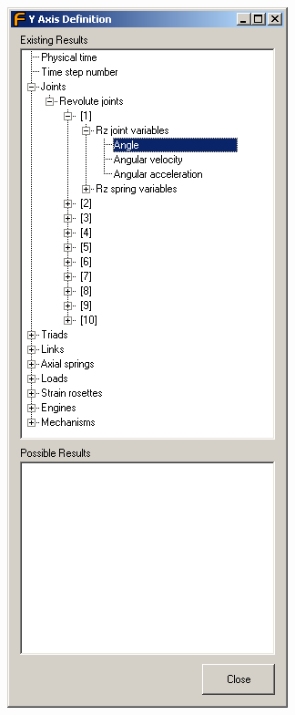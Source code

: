 \hfill\begin{minipage}{0.4\textwidth}
  \includegraphics[width=\textwidth]{Figures/Dialogs/7-RDB-Selector-DragAndDrop}
\end{minipage}

